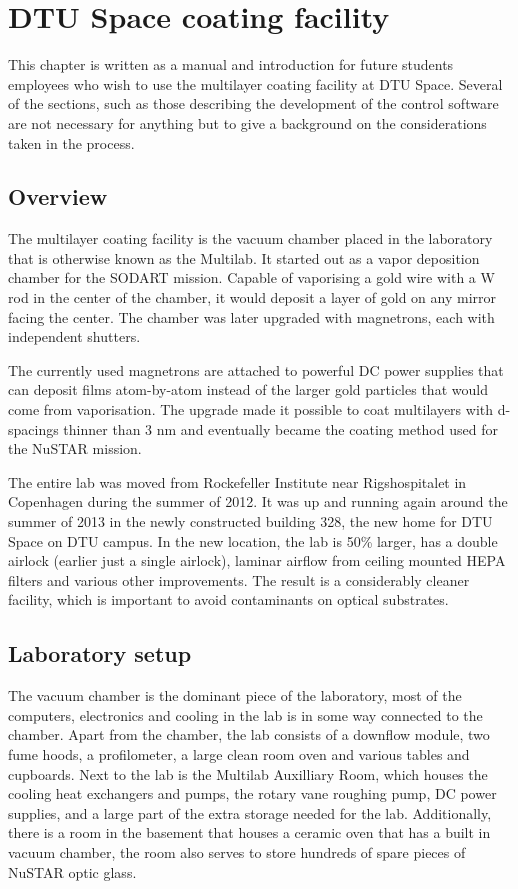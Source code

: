 \chapter{DTU Space coating facility}
This chapter is written as a manual and introduction for future students employees who wish to use the multilayer coating facility at DTU Space. Several of the sections, such as those describing the development of the control software are not necessary for anything but to give a background on the considerations taken in the process.

\section{Overview}
The multilayer coating facility is the vacuum chamber placed in the laboratory that is otherwise known as the Multilab. It started out as a vapor deposition chamber for the SODART mission. Capable of vaporising a gold wire with a W rod in the center of the chamber, it would deposit a layer of gold on any mirror facing the center. The chamber was later upgraded with magnetrons, each with independent shutters.

The currently used magnetrons are attached to powerful DC power supplies that can deposit films atom-by-atom instead of the larger gold particles that would come from vaporisation. The upgrade made it possible to coat multilayers with d-spacings thinner than 3 nm and eventually became the coating method used for the NuSTAR mission.

The entire lab was moved from Rockefeller Institute near Rigshospitalet in Copenhagen during the summer of 2012. It was up and running again around the summer of 2013 in the newly constructed building 328, the new home for DTU Space on DTU campus. In the new location, the lab is 50\% larger, has a double airlock (earlier just a single airlock), laminar airflow from ceiling mounted HEPA filters and various other improvements. The result is a considerably cleaner facility, which is important to avoid contaminants on optical substrates.

\section{Laboratory setup}
The vacuum chamber is the dominant piece of the laboratory, most of the computers, electronics and cooling in the lab is in some way connected to the chamber. Apart from the chamber, the lab consists of a downflow module, two fume hoods, a profilometer, a large clean room oven and various tables and cupboards. Next to the lab is the Multilab Auxilliary Room, which houses the cooling heat exchangers and pumps, the rotary vane roughing pump, DC power supplies, and a large part of the extra storage needed for the lab. Additionally, there is a room in the basement that houses a ceramic oven that has a built in vacuum chamber, the room also serves to store hundreds of spare pieces of NuSTAR optic glass.

